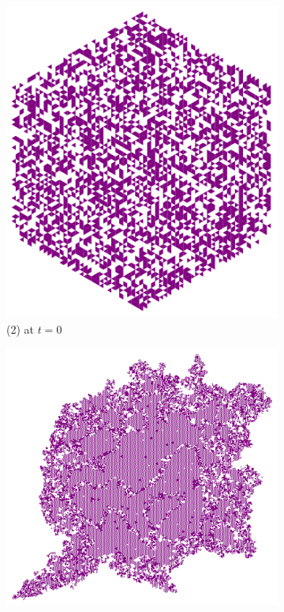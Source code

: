 \documentclass{article}
\begin{document}
\begin{figure}[H]
\begin{subfigure}[b]{0.3\textwidth}
         \includegraphics[width=\textwidth]{graphics/behavior/chaos/chaos-2-1.pdf}
         \caption*{(2) at $t=0$}
     \end{subfigure}
    \break\vspace{5mm}
     \begin{subfigure}[b]{0.48\textwidth}
         \centering
         \includegraphics[width=\textwidth]{graphics/behavior/chaos/chaos-1-2.pdf}

\end{subfigure}
\end{figure}
\end{document}
